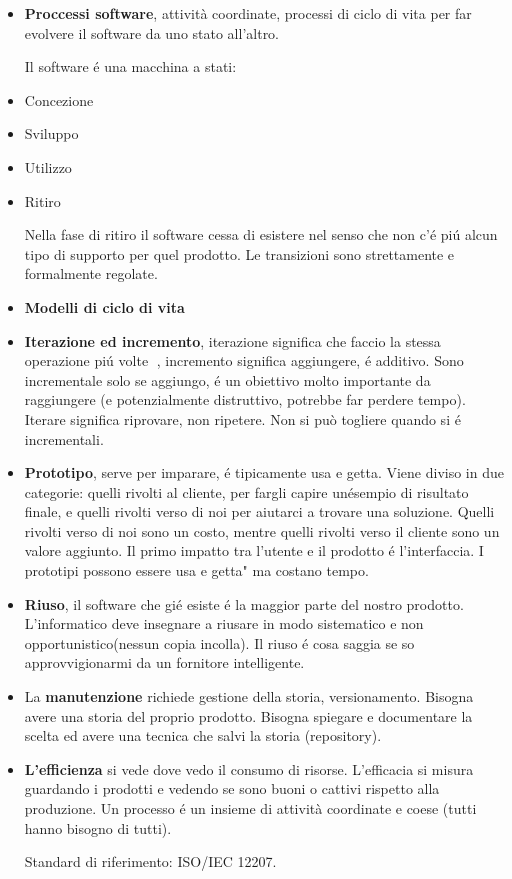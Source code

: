 \documentclass[a4paper,10pt] {article}
\begin{document}
\begin{itemize}
	
\item \textbf{Proccessi software}, attività coordinate, processi di ciclo di 
vita per far evolvere il software da uno stato all'altro.

Il software é una macchina a stati:
	\item Concezione
	\item Sviluppo
	\item Utilizzo
	\item Ritiro
	
Nella fase di ritiro il software cessa di esistere nel senso che non c'é pi\'u 
alcun tipo di supporto per quel prodotto.
Le transizioni sono strettamente e formalmente regolate.


\item \textbf{Modelli di ciclo di vita}

\item \textbf{Iterazione ed incremento}, iterazione significa che faccio la 
stessa operazione pi\'u volte , incremento significa aggiungere, é additivo. 
Sono incrementale solo se aggiungo, é un obiettivo molto importante da 
raggiungere (e potenzialmente distruttivo, potrebbe far perdere tempo). Iterare 
significa riprovare, non ripetere. Non si può togliere quando si é 
incrementali.

\item \textbf{Prototipo}, serve per imparare, é tipicamente usa e getta. Viene 
diviso in due categorie: quelli rivolti al cliente, per fargli capire un\' 
esempio di risultato finale, e quelli rivolti verso di noi per aiutarci a 
trovare una soluzione. Quelli rivolti verso di noi sono un costo, mentre quelli 
rivolti verso il cliente sono un valore aggiunto. Il primo impatto tra l'utente 
e il prodotto é l'interfaccia. I prototipi possono essere usa e getta" ma 
costano tempo.

\item \textbf{Riuso}, il software che gié esiste é la maggior parte del nostro 
prodotto. L'informatico deve insegnare a riusare in modo sistematico e non 
opportunistico(nessun copia incolla). Il riuso é cosa saggia se so 
approvvigionarmi da un fornitore intelligente.

\item La \textbf{manutenzione} richiede gestione della storia, versionamento. 
Bisogna avere una storia del proprio prodotto. Bisogna spiegare e documentare 
la scelta ed avere una tecnica che salvi la storia (repository).

\item \textbf{L'efficienza} si vede dove vedo il consumo di risorse. 
L'efficacia si 
misura guardando i prodotti e vedendo se sono buoni o cattivi rispetto alla 
produzione. Un processo é un insieme di attività coordinate e coese (tutti 
hanno bisogno di tutti).

Standard di riferimento: ISO/IEC 12207.	
\end{itemize}
\end{document}
